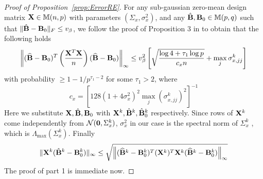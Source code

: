 \documentclass[fleqn,11pt]{article}
\numberwithin{equation}{section}
\begin{document}
\begin{proof}[Proof of Proposition~\ref{prop:ErrorRE}]

For any sub-gaussian zero-mean design matrix ${\mathbf{X}} \in {\mathbb{M}}(n,p)$ with parameters $(\Sigma_x, \sigma_x^2)$, and any $\hat {{\mathbf{B}}}, {\mathbf{B}}_0 \in {\mathbb{M}}(p,q)$ such that $\| \hat {{\mathbf{B}}} - {\mathbf{B}}_0 \|_F \leq v_\beta$, we follow the proof of Proposition 3 in \cite{LinEtal16} to obtain that the following holds
%
$$
\left\| (\widehat {{\mathbf{B}}} - {\mathbf{B}}_0)^T \left( \frac{{\mathbf{X}}^T {\mathbf{X}}}{n} \right) (\widehat {{\mathbf{B}}} - {\mathbf{B}}_0) \right\|_\infty \leq
v_\beta^2 \left[ \sqrt{ \frac{ \log 4 + \tau_1 \log p}{c_x n}} + \max_j \sigma_{x,jj}^k \right]
$$
%
with probability $\geq 1 - 1/p^{\tau_1-2}$ for some $\tau_1>2$, where
%
$$
c_x = \left[ 128 ( 1 + 4 \sigma_x^2)^2 \max_j (\sigma_{x,jj}^k)^2 \right]^{-1}
$$
%
Here we substitute ${\mathbf{X}}, \hat {{\mathbf{B}}}, {\mathbf{B}}_0$ with ${\mathbf{X}}^k, \hat {{\mathbf{B}}}^k, \hat {{\mathbf{B}}}_0^k$ respectively. Since rows of ${\mathbf{X}}^k$ come independently from ${\cal{N}}( {\bf 0}, \Sigma_x^k)$, $\sigma_x^2$ in our case is the spectral norm of $\Sigma_x^k$ \citep{LohWainwright12}, which is $\Lambda_{\max} (\Sigma_x^k)$. Finally
%
$$
\| {\mathbf{X}}^k ( \hat {{\mathbf{B}}}^k - {\mathbf{B}}_0^k ) \|_\infty \leq 
\sqrt{\left\| (\widehat {{\mathbf{B}}}^k - {\mathbf{B}}_0^k)^T ({\mathbf{X}}^k)^T {\mathbf{X}}^k (\widehat {{\mathbf{B}}}^k - {\mathbf{B}}_0^k) \right\|_\infty}
$$
%
The proof of part 1 is immediate now.


\end{proof}
\end{document}
